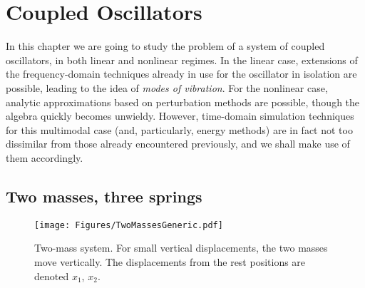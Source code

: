 
\newcommand{\dif}{\mathop{}\!\mathrm{d}}
\newcommand{\al}{\alpha}
\newcommand{\bt}{\beta}
\newcommand{\om}{\omega}
\newcommand{\gm}{\gamma}
\newcommand{\lb}{\lambda}
\newcommand{\lm}{\lambda_-}
\newcommand{\lp}{\lambda_+}
\newcommand{\thw}{\theta_w}
\newcommand{\thp}{\theta_\phi}
\newcommand{\tht}{\theta}

\newcommand{\etp}{e_{t+}}
\newcommand{\etm}{e_{t-}}

\newcommand{\esp}{e_{x+}}
\newcommand{\esm}{e_{x-}}

\newcommand{\dsp}{\delta_{x+}}
\newcommand{\dsm}{\delta_{x-}}
\newcommand{\dsd}{\delta_{x\cdot}}
\newcommand{\dss}{\delta_{xx}}
\newcommand{\dssss}{\delta_{xxxx}}

\newcommand{\dtp}{\delta_{t+}}
\newcommand{\dtm}{\delta_{t-}}
\newcommand{\dtd}{\delta_{t\cdot}}
\newcommand{\dtt}{\delta_{tt}}
\newcommand{\dtttt}{\delta_{tttt}}
\newcommand{\dspm}{\delta_{x\pm}}

\newcommand{\mtp}{\mu_{t+}}
\newcommand{\mtm}{\mu_{t-}}
\newcommand{\mtd}{\mu_{t\cdot}}
\newcommand{\mtt}{\mu_{tt}}

\newcommand{\norm}[1]{\left\|#1\right\|}
\newcommand{\innp}[1]{\left\langle#1\right\rangle}
\newcommand{\virg}[1]{``#1''}

\chapter{Coupled Oscillators}

In this chapter we are going to study the problem of a system of coupled oscillators, in both linear and nonlinear regimes. In the linear case, extensions of the frequency-domain techniques already in use for the oscillator in isolation are possible, leading to the idea of \emph{modes of vibration}. For the nonlinear case, analytic approximations based on perturbation methods are possible, though the algebra quickly becomes unwieldy. However, time-domain simulation techniques for this multimodal case (and, particularly, energy methods) are in fact not too dissimilar from those already encountered previously, and we shall make use of them accordingly. 


\section{Two masses, three springs}
\begin{figure}
\texttt{[image: Figures/TwoMassesGeneric.pdf]}
\caption{Two-mass system. For small vertical displacements, the two masses move vertically. The displacements from the rest positions are denoted $x_1$, $x_2$.}\label{fig:TwoMassesGeneric}
\end{figure}


